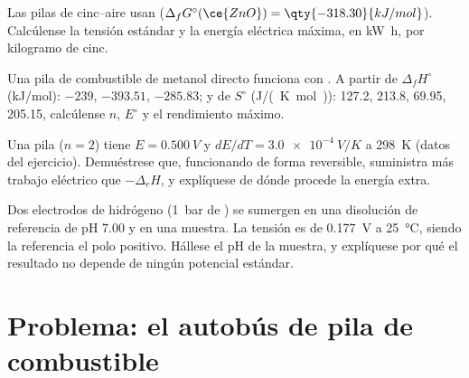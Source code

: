 \begin{exercise}[$\star\star$]\label{exo:b2:cell-thermodynamics:9}
Las pilas de cinc--aire usan  ($\Delta_f G^\circ(\ce{ZnO}) =
\qty{-318.30}{kJ/mol}$). Calcúlense la tensión estándar y la energía eléctrica
máxima, en \unit{kW.h}, por kilogramo de cinc.
\end{exercise}

\begin{exercise}[$\star\star\star$]\label{exo:b2:cell-thermodynamics:10}
Una pila de combustible de metanol directo funciona con . A partir de
$\Delta_f H^\circ$ (\unit{kJ/mol}):  $-239$,  $-393.51$,
 $-285.83$; y de $S^\circ$ (\unit{J/(K.mol)}):  127.2,
 213.8,  69.95,  205.15, calcúlense $n$, $E^\circ$ y el
rendimiento máximo.
\end{exercise}

\begin{exercise}[$\star\star\star$]\label{exo:b2:cell-thermodynamics:11}
Una pila ($n = 2$) tiene $E = \qty{0.500}{V}$ y $dE/dT = \qty{+3.0e-4}{V/K}$ a
\qty{298}{K} (datos del ejercicio). Demuéstrese que, funcionando de forma reversible, suministra más
trabajo eléctrico que $-\Delta_r H$, y explíquese de dónde procede la energía extra.
\end{exercise}

\begin{exercise}[$\star\star\star$]\label{exo:b2:cell-thermodynamics:12}
Dos electrodos de hidrógeno (\qty{1}{bar} de ) se sumergen en una disolución de referencia de
pH 7.00 y en una muestra. La tensión es de \qty{0.177}{V} a \qty{25}{\degreeCelsius},
siendo la referencia el polo positivo. Hállese el pH de la muestra, y explíquese
por qué el resultado no depende de ningún potencial estándar.
\end{exercise}

\section{Problema: el autobús de pila de combustible}

